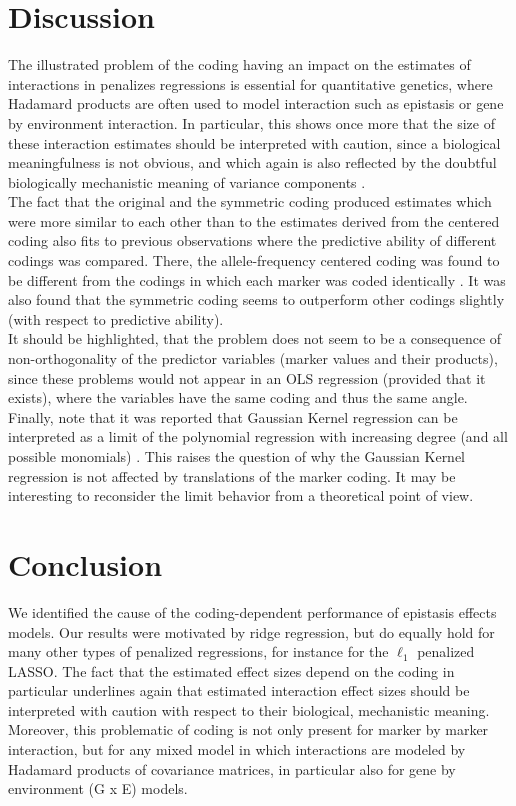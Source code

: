 \documentclass{bmcart}
\newcommand{\0}{\mathbf{0}}
\begin{document}
\section*{Discussion}
The illustrated problem of the coding having an impact on the estimates of interactions in penalizes regressions is essential for quantitative genetics, where Hadamard products are often used to model interaction such as epistasis or gene by environment interaction. In particular, this shows once more that the size of these interaction estimates should be interpreted with caution, since a biological meaningfulness is not obvious, and which again is also reflected by the doubtful biologically mechanistic meaning of variance components \cite{Huang16}.\\

The fact that the original and the symmetric coding produced estimates which were more similar to each other than to the estimates derived from the centered coding also fits to previous observations where the predictive ability of different codings was compared. There, the allele-frequency centered coding was found to be different from the codings in which each marker was coded identically \cite{Martini17}. 
It was also found that the symmetric coding seems to outperform other codings slightly (with respect to predictive ability). \\

It should be highlighted, that the problem does not seem to be a consequence of non-orthogonality of the predictor variables (marker values and their products), since these problems would not appear in an OLS regression (provided that it exists), where the variables have the same coding and thus the same angle. \\

Finally, note that it was reported that Gaussian Kernel regression \cite{Morota14} can be interpreted as a limit of the polynomial regression with increasing degree (and all possible monomials) \cite{jiang15}. 
This raises the question of why the Gaussian Kernel regression is not affected by translations of the marker coding. It may be interesting to reconsider the limit behavior from a theoretical point of view.


\section*{Conclusion}
We identified the cause of the coding-dependent performance of epistasis effects models. Our results were motivated by ridge regression, but do equally hold for many other types of penalized regressions, for instance for the $\ell_1$ penalized LASSO. The fact that the estimated effect sizes depend on the coding in particular underlines again that estimated interaction effect sizes should be interpreted with caution with respect to their biological, mechanistic meaning. Moreover, this problematic of coding is not only present for marker by marker interaction, but for any mixed model in which interactions are modeled by Hadamard products of covariance matrices, in particular also for gene by environment (G x E) models.
\end{document}
